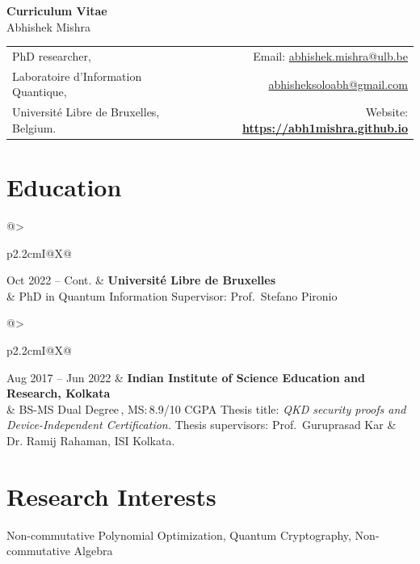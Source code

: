 \documentclass[a4paper,11pt]{article}
\makeatletter
\newcommand{\cventryblue}[3]{%
  \noindent
  \begin{tabularx}{\textwidth}{@{}>{\small\raggedright\arraybackslash}p{2.2cm}I@{\hspace{0.4cm}}X@{}}
    #1 & \textbf{#2} \\
    & #3
  \end{tabularx}\vspace{0.3em}
}
\makeatother
\begin{document}
\begin{center}
  {\large\bfseries Curriculum Vitae}\\[0.3em]
  {\LARGE Abhishek Mishra}
\end{center}

\vspace{0.3em}

\noindent
\begin{tabularx}{\textwidth}{@{}X r@{}}
  PhD researcher, & Email: \href{mailto:abhishek.mishra@ulb.be}{abhishek.mishra@ulb.be} \\
  Laboratoire d'Information Quantique, & \href{mailto:abhisheksoloabh@gmail.com}{abhisheksoloabh@gmail.com} \\
  Université Libre de Bruxelles, Belgium. & Website: \href{https://abh1mishra.github.io}{\textbf{https://abh1mishra.github.io}} \\
\end{tabularx}

\section*{Education}
\cventryblue{Oct 2022 -- Cont.}{Université Libre de Bruxelles}{%
  PhD in Quantum Information\newline
  Supervisor: Prof.\ Stefano Pironio
}

\cventryblue{Aug 2017 -- Jun 2022}{Indian Institute of Science Education and Research, Kolkata}{%
  BS-MS Dual Degree\,, MS:\,\textnormal{8.9/10 CGPA} \newline
  Thesis title: \textit{QKD security proofs and Device-Independent Certification.}\newline
  Thesis supervisors: Prof.\ Guruprasad Kar \& Dr. Ramij Rahaman, ISI Kolkata.
}


\section*{Research Interests}

\begin{center}
Non-commutative Polynomial Optimization, Quantum Cryptography, Non-commutative Algebra
\end{center}
\end{document}

